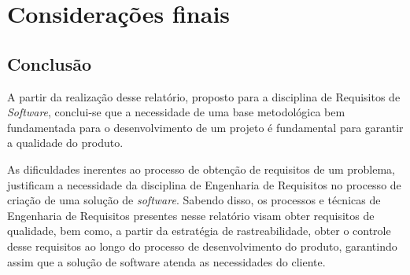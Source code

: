 \chapter[Considerações finais]{Considerações finais}

  \section*{Conclusão}
    
    A partir da realização desse relatório, proposto para a disciplina de Requisitos de \textit{Software}, 
    conclui-se que a necessidade de uma base metodológica bem fundamentada para o desenvolvimento de um projeto é 
    fundamental para garantir a qualidade do produto. 
    
    As dificuldades inerentes ao processo de obtenção de requisitos de um problema, 
    justificam a necessidade da disciplina de Engenharia de Requisitos no processo de criação de uma solução de \textit{software}. 
    Sabendo disso, os processos e técnicas de Engenharia de Requisitos presentes nesse relatório visam obter requisitos de qualidade, 
    bem como, a partir da estratégia de rastreabilidade, 
    obter o controle desse requisitos ao longo do processo de desenvolvimento do produto, 
    garantindo assim que a solução de software atenda as necessidades do cliente.